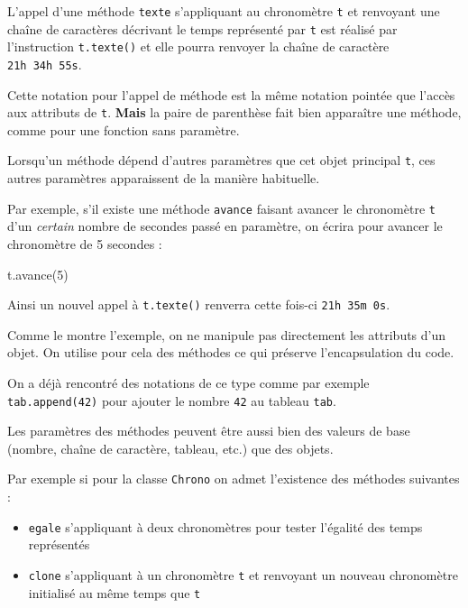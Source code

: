 \documentclass[a4paper,17pt]{extarticle}
\providecommand{\tightlist}{%
      \setlength{\itemsep}{0pt}\setlength{\parskip}{0pt}}
\newenvironment{Shaded}{}{}
\newcommand{\DecValTok}[1]{\textcolor[rgb]{0.25,0.63,0.44}{{#1}}}
\newcommand{\NormalTok}[1]{{#1}}
\begin{document}
    L'appel d'une méthode \texttt{texte} s'appliquant au chronomètre
\texttt{t} et renvoyant une chaîne de caractères décrivant le temps
représenté par \texttt{t} est réalisé par l'instruction
\texttt{t.texte()} et elle pourra renvoyer la chaîne de caractère
\texttt{\textquotesingle{}21h\ 34h\ 55s\textquotesingle{}}.

    Cette notation pour l'appel de méthode est la même notation pointée que
l'accès aux attributs de \texttt{t}. \textbf{Mais} la paire de
parenthèse fait bien apparaître une méthode, comme pour une fonction
sans paramètre.

Lorsqu'un méthode dépend d'autres paramètres que cet objet principal
\texttt{t}, ces autres paramètres apparaissent de la manière habituelle.

    Par exemple, s'il existe une méthode \texttt{avance} faisant avancer le
chronomètre \texttt{t} d'un \emph{certain} nombre de secondes passé en
paramètre, on écrira pour avancer le chronomètre de 5 secondes :

\begin{Shaded}
\begin{Highlighting}[]
\NormalTok{t.avance(}\DecValTok{5}\NormalTok{)}
\end{Highlighting}
\end{Shaded}

Ainsi un nouvel appel à \texttt{t.texte()} renverra cette fois-ci
\texttt{\textquotesingle{}21h\ 35m\ 0s\textquotesingle{}}.

    Comme le montre l'exemple, on ne manipule pas directement les attributs
d'un objet. On utilise pour cela des méthodes ce qui préserve
l'encapsulation du code.

    On a déjà rencontré des notations de ce type comme par exemple
\texttt{tab.append(42)} pour ajouter le nombre \texttt{42} au tableau
\texttt{tab}.

    Les paramètres des méthodes peuvent être aussi bien des valeurs de base
(nombre, chaîne de caractère, tableau, etc.) que des objets.

    Par exemple si pour la classe \texttt{Chrono} on admet l'existence des
méthodes suivantes :

\begin{itemize}
\tightlist
\item
  \texttt{egale} s'appliquant à deux chronomètres pour tester l'égalité
  des temps représentés
\item
  \texttt{clone} s'appliquant à un chronomètre \texttt{t} et renvoyant
  un nouveau chronomètre initialisé au même temps que \texttt{t}
\end{itemize}
\end{document}
